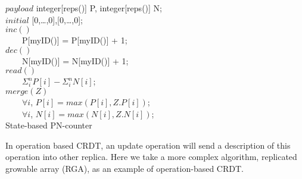 \renewcommand{\algorithmcfname}{CRDT}
\noindent
\noindent\begin{algorithm}[H]
$\mathit{payload}$ integer[reps()] P, integer[reps()] N; \\
$\mathit{initial}$ [0,\ldots,0],[0,\ldots,0]; \\ 

$inc()$ \\ 
\ \ \ \ P[myID()] = P[myID()] + 1; \\

$dec()$ \\
\ \ \ \ N[myID()] = N[myID()] + 1; \\ 

$read()$ \\
\ \ \ \ \KwRet $\Sigma_{i}^{n} P[i] - \Sigma_{i}^{n} N[i]$; \\ 

$merge(Z)$ \\
\ \ \ \ $\forall i$, $P[i] = \mathit{max}(P[i],Z.P[i])$; \\
\ \ \ \ $\forall i$, $N[i] = \mathit{max}(N[i],Z.N[i])$; \\
\caption{State-based PN-counter}
\label{Method1}
\end{algorithm}

In operation based CRDT, an update operation will send a description of this operation into other replica. Here we take a more complex algorithm, replicated growable array (RGA), as an example of operation-based CRDT. 


